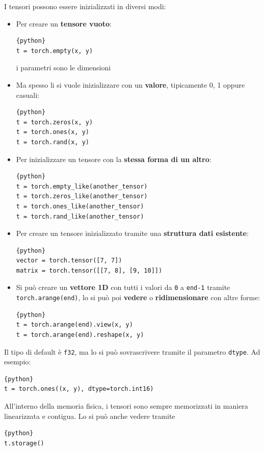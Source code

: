 I tensori possono essere inizializzati in diversi modi: 
\begin{itemize}
    \item Per creare un \textbf{tensore vuoto}:
    \begin{lstlisting}{python}
t = torch.empty(x, y)
    \end{lstlisting}
    i parametri sono le dimensioni
    
    \item Ma spesso li si vuole inizializzare con un \textbf{valore}, tipicamente 0, 1 oppure casuali:
    \begin{lstlisting}{python}
t = torch.zeros(x, y)
t = torch.ones(x, y)
t = torch.rand(x, y)
    \end{lstlisting}
    
    \item Per inizializzare un tensore con la \textbf{stessa forma di un altro}:
    \begin{lstlisting}{python}
t = torch.empty_like(another_tensor)
t = torch.zeros_like(another_tensor)
t = torch.ones_like(another_tensor)
t = torch.rand_like(another_tensor)
    \end{lstlisting}
    
    \item Per creare un tensore inizializzato tramite una \textbf{struttura dati esistente}:
    \begin{lstlisting}{python}
vector = torch.tensor([7, 7])
matrix = torch.tensor([[7, 8], [9, 10]])
    \end{lstlisting}
    
    \item Si può creare un \textbf{vettore 1D} con tutti i valori da \texttt{0} a \texttt{end-1} tramite \texttt{torch.arange(end)}, lo si può poi \textbf{vedere} o \textbf{ridimensionare} con altre forme:
    \begin{lstlisting}{python}
t = torch.arange(end).view(x, y)
t = torch.arange(end).reshape(x, y)
    \end{lstlisting}
\end{itemize}

Il tipo di default è \texttt{f32}, ma lo si può sovrascrivere tramite il parametro \texttt{dtype}. Ad esempio:
\begin{lstlisting}{python}
t = torch.ones((x, y), dtype=torch.int16)
\end{lstlisting}

All'interno della memoria fisica, i tensori sono sempre memorizzati in maniera linearizzata e contigua. Lo si può anche vedere tramite
\begin{lstlisting}{python}
t.storage()
\end{lstlisting}

